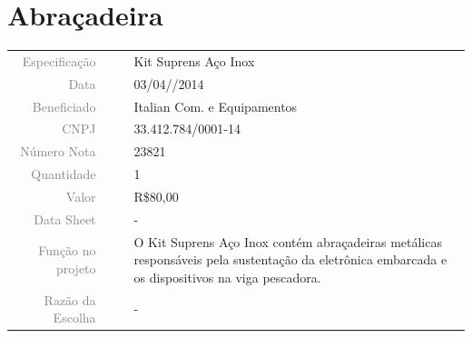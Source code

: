 

\section{Abraçadeira}
\label{abracadeira}

 
\begin{table}[ht!]

	\begin{tabular}{r l|l p{12cm} }
		
		\textcolor{gray}{Especificação} &&& 	{Kit Suprens Aço Inox}\\
		\textcolor{gray}{Data} &&& 				{03/04//2014}\\
        \textcolor{gray}{Beneficiado} &&&		{Italian Com. e Equipamentos} \\
        \textcolor{gray}{CNPJ} &&& 				{33.412.784/0001-14} \\
        \textcolor{gray}{Número Nota} &&& 		{23821} \\
		\textcolor{gray}{Quantidade} &&& 		{1} \\
		\textcolor{gray}{Valor} &&& 			{R\$80,00} \\
		\textcolor{gray}{Data Sheet} &&& 		{-} \\

		\textcolor{gray}{Função no projeto} &&& {O Kit Suprens Aço Inox contém
		abraçadeiras metálicas responsáveis pela sustentação da eletrônica embarcada
		e os dispositivos na viga pescadora.}
		\\
		\textcolor{gray}{Razão da Escolha} &&& {-}
		

	\end{tabular}
\end{table}

\newpage

